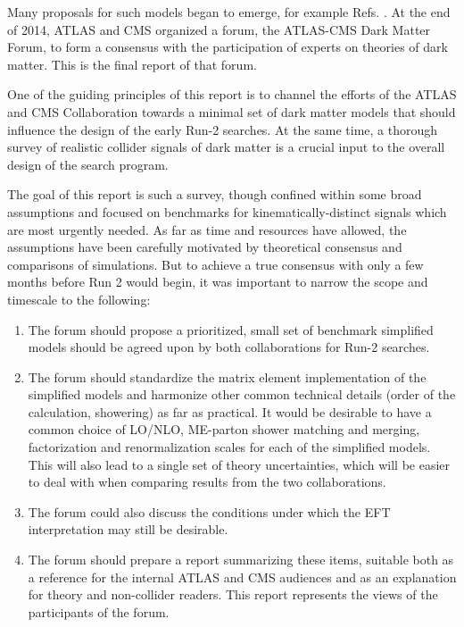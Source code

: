 Many proposals for such models began to emerge, for example
Refs. \cite{An:2012va,An:2012ue,Tait:2013,Buchmueller:2013dya,Bai:2013iqa,Bai:2014osa,An:201489115014,Yavin:14092893,Malik:2014ggr,Harris:2014hga,Buckley:2014fba,Haisch:2015ioa}. At
the end of 2014, ATLAS and CMS organized a forum, the ATLAS-CMS Dark
Matter Forum, to form a consensus with the participation of experts on
theories of dark matter. This is the final report of that forum.

One of the guiding principles of this report is to channel the efforts
of the ATLAS and CMS Collaboration towards a minimal set of dark
matter models that should influence the design of the early Run-2
searches. At the same time, a thorough survey of realistic collider
signals of dark matter is a crucial input to the overall design of the
search program.

The goal of this report is such a survey, though confined within some
broad assumptions and focused on benchmarks for kinematically-distinct
signals which are most urgently needed. As far as time and resources
have allowed, the assumptions have been carefully motivated by
theoretical consensus and comparisons of simulations. But to achieve a
true consensus with only a few months before Run 2 would begin, it was
important to narrow the scope and timescale to the following:

\begin{enumerate}
\item The forum should propose a prioritized, small set of benchmark
  simplified models should be agreed upon by both collaborations for
  Run-2 searches.
\item The forum should standardize the matrix element implementation
  of the simplified models and harmonize other common technical
  details (order of the calculation, showering) as far as practical. It
  would be desirable to have a common choice of LO/NLO, ME-parton
  shower matching and merging, factorization and renormalization
  scales for each of the simplified models. This will also lead to a
  single set of theory uncertainties, which will be easier to deal
  with when comparing results from the two collaborations.
\item The forum could also discuss the conditions under which the EFT
  interpretation may still be desirable.
\item The forum should prepare a report summarizing these items,
  suitable both as a reference for the internal ATLAS and CMS
  audiences and as an explanation for theory and non-collider
  readers. This report represents the views of the participants of the
  forum.
\end{enumerate}

